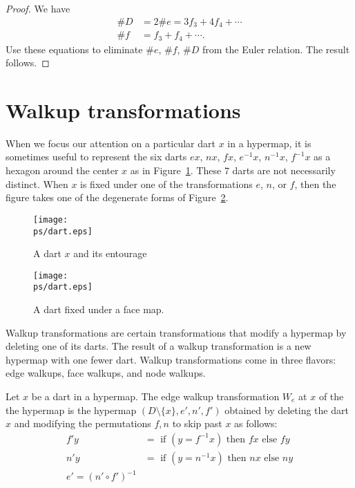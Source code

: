\begin{proof}  We have
    $$
    \begin{array}{lll}
     \# D &= 2 \# e = 3 f_3 + 4 f_4 + \cdots\\
    \# f &= f_3 + f_4 + \cdots.
    \end{array}
    $$
Use these equations to eliminate $\#e$, $\#f$, $\#D$ from the Euler
relation.  The result follows.
\end{proof}



\section{Walkup transformations}

When we focus our attention on a particular dart $x$ in a
hypermap, it is sometimes useful to represent the six darts $e x$,
$n x$, $f x$, $e^{-1} x$, $n^{-1} x$, $f^{-1} x$ as a hexagon
around the center $x$ as in Figure~\ref{fig:dart+}.  These $7$
darts are not necessarily distinct.   When $x$ is fixed under one
of the transformations $e$, $n$, or $f$, then the figure takes one
of the degenerate forms of Figure~\ref{fig:dart-fix}.

\begin{figure}[htb]
  \centering
  \texttt{[image: \\ps/dart.eps]}
  \caption{A dart $x$ and its entourage}
  \label{fig:dart+}
\end{figure}

\begin{figure}[htb]
  \centering
  \texttt{[image: \\ps/dart.eps]}
  \caption{A dart fixed under a face map.}
  \label{fig:dart-fix}
\end{figure}

Walkup transformations are certain transformations that modify a
hypermap by deleting one of its darts.  The result of a walkup
transformation is a new hypermap with one fewer dart.  Walkup
transformations come in three flavors: edge walkups, face walkups,
and node walkups.

\begin{definition}
Let $x$ be a dart in a hypermap.  The edge walkup transformation
$W_e$ at $x$ of the the hypermap is the hypermap
$(D\setminus\{x\},e',n',f')$ obtained by deleting the dart $x$ and
modifying the permutations $f,n$ to skip past $x$ as follows:
    $$
    \begin{array}{lll}
    f' y &= \text{ if } (y = f^{-1} x) \text{ then } f x \text{ else
    } f y\\
    n' y &= \text{ if } (y = n^{-1} x) \text{ then } n x \text{ else
    } n y\\
    e' = (n'\circ f')^{-1}
    \end{array}
    $$
\end{definition}

